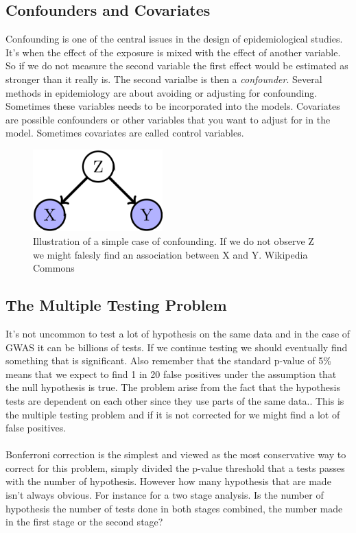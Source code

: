 \documentclass[10pt,a4paper]{report}
\begin{document}
\subsection{Confounders and Covariates}
Confounding is one of the central issues in the design of epidemiological studies. It's when the effect of the exposure is mixed with the effect of another variable. So if we do not measure the second variable the first effect would be estimated as stronger than it really is. The second varialbe is then a \emph{confounder}. Several methods in epidemiology are about avoiding or adjusting for confounding. Sometimes these variables needs to be incorporated into the models. Covariates are possible confounders or other variables that you want to adjust for in the model. Sometimes covariates are called control variables.\cite{rothman2002intro_epidemiology,rothman1998modern}

\begin{figure}[h]
    \centering
    \includegraphics[width=5cm]{Simple_Confounding_Case.png}
    \caption{Illustration of a simple case of confounding. If we do not observe Z we might falesly find an association between X and Y. Wikipedia Commons}
    \label{fig:confunding}
\end{figure}

\subsection{The Multiple Testing Problem}
It's not uncommon to test a lot of hypothesis on the same data and in the case of GWAS it can be billions of tests. If we continue testing we should eventually find something that is significant. Also remember that the standard p-value of 5\% means that we expect to find 1 in 20 false positives under the assumption that the null hypothesis is true. The problem arise from the fact that the hypothesis tests are dependent on each other since they use parts of the same data.. This is the multiple testing problem and if it is not corrected for we might find a lot of false positives.\cite{bonferroni_multiple}\\
\\
Bonferroni correction is the simplest and viewed as the most conservative way to correct for this problem, simply divided the p-value threshold that a tests passes with the number of hypothesis. However how many hypothesis that are made isn't always obvious. For instance for a two stage analysis. Is the number of hypothesis the number of tests done in both stages combined, the number made in the first stage or the second stage?\cite{bonferroni_multiple}
\end{document}
